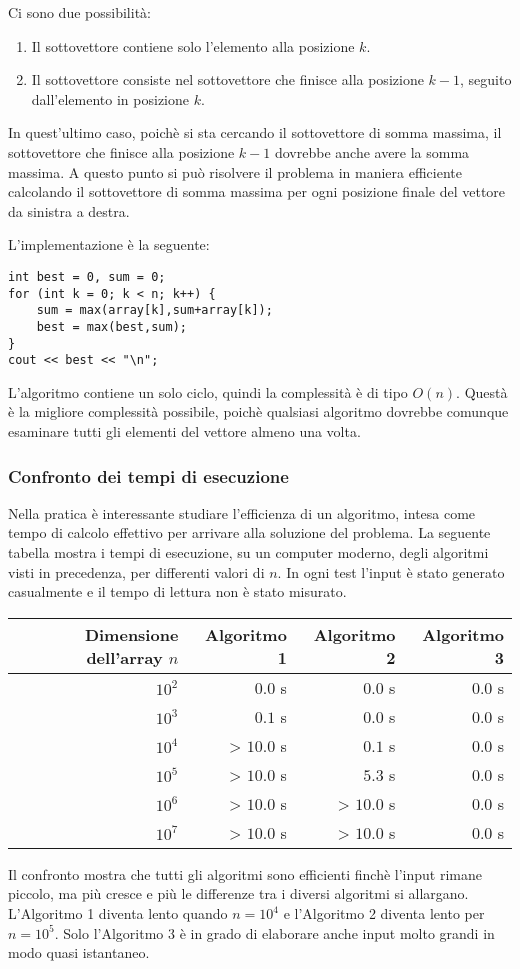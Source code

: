 Ci sono due possibilità:
\begin{enumerate}
\item Il sottovettore contiene solo l'elemento alla posizione $k$.
\item Il sottovettore consiste nel sottovettore che finisce alla posizione $k-1$, 
seguito dall'elemento in posizione $k$.
\end{enumerate}

In quest'ultimo caso, poichè si sta cercando il 
sottovettore di somma massima,
il sottovettore che finisce alla posizione $k-1$
dovrebbe anche avere la somma massima.
A questo punto si può risolvere il problema in maniera efficiente 
calcolando il sottovettore di somma massima per ogni posizione finale 
del vettore da sinistra a destra.

L'implementazione è la seguente:

\begin{lstlisting}
int best = 0, sum = 0;
for (int k = 0; k < n; k++) {
    sum = max(array[k],sum+array[k]);
    best = max(best,sum);
}
cout << best << "\n";
\end{lstlisting}

L'algoritmo contiene un solo ciclo, 
quindi la complessità è di tipo $O(n)$. 
Questà è la migliore complessità possibile,
poichè qualsiasi algoritmo dovrebbe comunque esaminare
tutti gli elementi del vettore almeno una volta.

\subsubsection{Confronto dei tempi di esecuzione}

Nella pratica è interessante studiare l'efficienza
di un algoritmo, intesa come tempo di calcolo effettivo
per arrivare alla soluzione del problema.
La seguente tabella mostra i tempi di esecuzione,
su un computer moderno,
degli algoritmi visti in precedenza,
per differenti valori di $n$.
In ogni test l'input è stato generato casualmente e il 
tempo di lettura non è stato misurato.

\begin{center}
\begin{tabular}{rrrr}
Dimensione dell'array $n$ & Algoritmo 1 & Algoritmo 2 & Algoritmo 3 \\
\hline
$10^2$ & $0.0$ s & $0.0$ s & $0.0$ s \\
$10^3$ & $0.1$ s & $0.0$ s & $0.0$ s \\
$10^4$ & > $10.0$ s & $0.1$ s & $0.0$ s \\
$10^5$ & > $10.0$ s & $5.3$ s & $0.0$ s \\
$10^6$ & > $10.0$ s & > $10.0$ s & $0.0$ s \\
$10^7$ & > $10.0$ s & > $10.0$ s & $0.0$ s \\
\end{tabular}
\end{center}

Il confronto mostra che tutti gli algoritmi
sono efficienti finchè l'input rimane piccolo,
ma più cresce e più le differenze tra i diversi algoritmi
si allargano. L'Algoritmo 1 diventa lento
quando $n=10^4$ e l'Algoritmo 2 diventa lento
per $n=10^5$. Solo l'Algoritmo 3 è in grado di
elaborare anche input molto grandi in modo quasi istantaneo.
